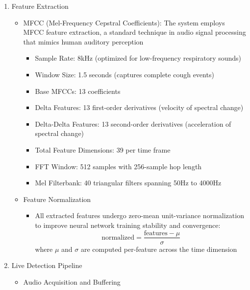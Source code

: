 \documentclass[conference]{IEEEtran}
\begin{document}
\begin{enumerate}
\begin{enumerate}
\begin{itemize}
                        \end{itemize}
                \end{enumerate}
            \item Feature Extraction
                \begin{itemize}
                    \item MFCC (Mel-Frequency Cepstral Coefficients):
                        The system employs MFCC feature extraction, a standard technique in audio signal processing that mimics human auditory perception
                         \begin{itemize} 
                            \item Sample Rate: 8kHz (optimized for low-frequency respiratory sounds) 
                            \item Window Size: 1.5 seconds (captures complete cough events) 
                            \item Base MFCCs: 13 coefficients 
                            \item Delta Features: 13 first-order derivatives (velocity of spectral change) 
                            \item Delta-Delta Features: 13 second-order derivatives (acceleration of spectral change) 
                            \item Total Feature Dimensions: 39 per time frame 
                            \item FFT Window: 512 samples with 256-sample hop length 
                            \item Mel Filterbank: 40 triangular filters spanning 50Hz to 4000Hz    
                        \end{itemize}
                    \item Feature Normalization
                    \begin{itemize}
                        \item All extracted features undergo zero-mean unit-variance normalization to improve neural network training stability and convergence: $$\text{normalized} = \frac{\text{features} - \mu}{\sigma}$$ where $\mu$ and $\sigma$ are computed per-feature across the time dimension
                    \end{itemize}
                \end{itemize}
            \item Live Detection Pipeline
                \begin{itemize}
                    \item Audio Acquisition and Buffering

\end{itemize}
\end{enumerate}
\end{document}
